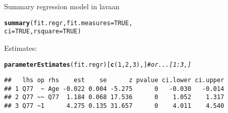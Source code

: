 \documentclass[10pt]{beamer}\usepackage[]{graphicx}\usepackage[]{xcolor}
\makeatletter
\newcommand{\hlnum}[1]{\textcolor[rgb]{0.686,0.059,0.569}{#1}}%
\newcommand{\hlcom}[1]{\textcolor[rgb]{0.678,0.584,0.686}{\textit{#1}}}%
\newcommand{\hldef}[1]{\textcolor[rgb]{0.345,0.345,0.345}{#1}}%
\newcommand{\hlkwc}[1]{\textcolor[rgb]{0.333,0.667,0.333}{#1}}%
\newcommand{\hlkwd}[1]{\textcolor[rgb]{0.737,0.353,0.396}{\textbf{#1}}}%
\newenvironment{kframe}{%
 \def\at@end@of@kframe{}%
 \ifinner\ifhmode%
  \def\at@end@of@kframe{\end{minipage}}%
  \begin{minipage}{\columnwidth}%
 \fi\fi%
 \def\FrameCommand##1{\hskip\@totalleftmargin \hskip-\fboxsep
 \colorbox{shadecolor}{##1}\hskip-\fboxsep
     \hskip-\linewidth \hskip-\@totalleftmargin \hskip\columnwidth}%
 \MakeFramed {\advance\hsize-\width
   \@totalleftmargin\z@ \linewidth\hsize
   \@setminipage}}%
 {\par\unskip\endMakeFramed%
 \at@end@of@kframe}
\newenvironment{knitrout}{}{} %
\makeatother
\begin{document}
\begin{frame}[fragile]{Summary regression model in lavaan}

\begin{knitrout}
\color{fgcolor}\begin{kframe}
\begin{alltt}
\hlkwd{summary}\hldef{(fit.regr,} \hlkwc{fit.measures} \hldef{=} \hlnum{TRUE}\hldef{,}
        \hlkwc{ci} \hldef{=} \hlnum{TRUE}\hldef{,} \hlkwc{rsquare} \hldef{=} \hlnum{TRUE}\hldef{)}
\end{alltt}
\end{kframe}
\end{knitrout}

\vspace{5mm}

Estimates: 
\begin{knitrout}
\color{fgcolor}\begin{kframe}
\begin{alltt}
\hlkwd{parameterEstimates}\hldef{(fit.regr)[}\hlkwd{c}\hldef{(}\hlnum{1}\hldef{,}\hlnum{2}\hldef{,}\hlnum{3}\hldef{),]} \hlcom{# or ...[1:3,]}
\end{alltt}
\begin{verbatim}
##   lhs op rhs    est    se      z pvalue ci.lower ci.upper
## 1 Q77  ~ Age -0.022 0.004 -5.275      0   -0.030   -0.014
## 2 Q77 ~~ Q77  1.184 0.068 17.536      0    1.052    1.317
## 3 Q77 ~1      4.275 0.135 31.657      0    4.011    4.540
\end{verbatim}
\end{kframe}
\end{knitrout}
\end{frame}
%
\end{document}

